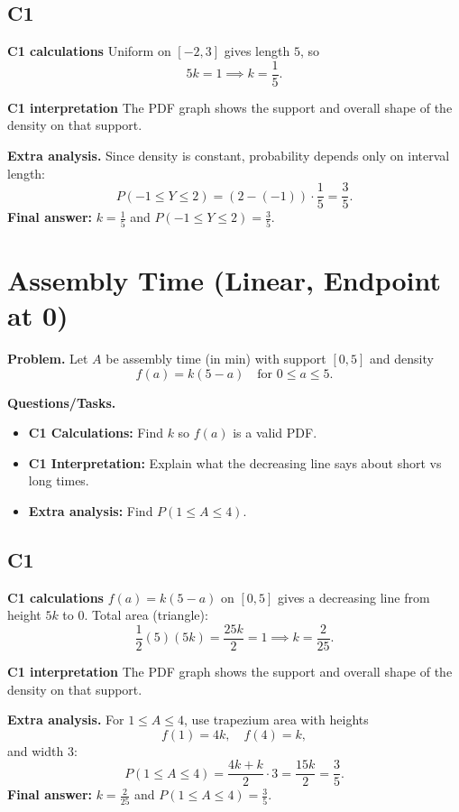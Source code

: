 	\subsection*{C1}

\textbf{C1 calculations}
Uniform on $[-2,3]$ gives length $5$, so
	\[
	5k=1\implies k=\frac15.
	\]

\textbf{C1 interpretation}
The PDF graph shows the support and overall shape of the density on that support.

\textbf{Extra analysis.}
Since density is constant, probability depends only on interval length:
\[
P(-1\le Y\le2)=(2-(-1))\cdot\frac15=\frac35.
\]
\textbf{Final answer:} $k=\frac15$ and $P(-1\le Y\le2)=\frac35$.
	\section{Assembly Time (Linear, Endpoint at 0)}
	
	\textbf{Problem.}
	Let $A$ be assembly time (in min) with support $[0,5]$ and density
	\[
	f(a)=k(5-a)\quad\text{for }0\le a\le 5.
	\]
	
	\textbf{Questions/Tasks.}
	\begin{itemize}
		\item \textbf{C1 Calculations:} Find $k$ so $f(a)$ is a valid PDF.
		\item \textbf{C1 Interpretation:} Explain what the decreasing line says about short vs long times.
		\item \textbf{Extra analysis:} Find $P(1\le A\le 4)$.
	\end{itemize}

	\subsection*{C1}

\textbf{C1 calculations}
$f(a)=k(5-a)$ on $[0,5]$ gives a decreasing line from height $5k$ to $0$.
	Total area (triangle):
	\[
	\frac12(5)(5k)=\frac{25k}{2}=1\implies k=\frac{2}{25}.
	\]

\textbf{C1 interpretation}
The PDF graph shows the support and overall shape of the density on that support.

\textbf{Extra analysis.}
For $1\le A\le4$, use trapezium area with heights
\[
f(1)=4k,\quad f(4)=k,
\]
and width $3$:
\[
P(1\le A\le4)=\frac{4k+k}{2}\cdot3=\frac{15k}{2}=\frac35.
\]
\textbf{Final answer:} $k=\frac{2}{25}$ and $P(1\le A\le4)=\frac35$.
